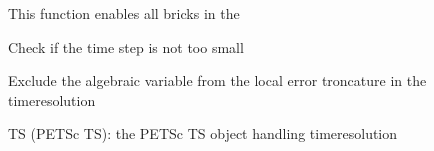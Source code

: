 \documentclass[letterpaper,10pt,english]{sphinxmanual}
\begin{document}
\begin{fulllineitems}
\begin{fulllineitems}
\end{fulllineitems}


\begin{fulllineitems}
\label{\detokenize{scrimp:scrimp.dphs.DPHS.enable_all_bricks}}
\pysigstartsignatures
\pysiglinewithargsret
{}
{}
{}
\pysigstopsignatures
\sphinxAtStartPar
This function enables all bricks in the 

\end{fulllineitems}


\begin{fulllineitems}
\label{\detokenize{scrimp:scrimp.dphs.DPHS.event}}
\pysigstartsignatures
\pysiglinewithargsret
{}
{\sphinxparamcomma {}\sphinxparamcomma {}\sphinxparamcomma {}}
{}
\pysigstopsignatures
\sphinxAtStartPar
Check if the time step is not too small

\end{fulllineitems}


\begin{fulllineitems}
\label{\detokenize{scrimp:scrimp.dphs.DPHS.exclude_algebraic_var_from_lte}}
\pysigstartsignatures
\pysiglinewithargsret
{}
{}
{}
\pysigstopsignatures
\sphinxAtStartPar
Exclude the algebraic variable from the local error troncature in the time\sphinxhyphen{}resolution
\begin{description}
\sphinxAtStartPar
TS (PETSc TS): the PETSc TS object handling time\sphinxhyphen{}resolution

\end{description}

\end{fulllineitems}



\end{fulllineitems}
\end{document}
